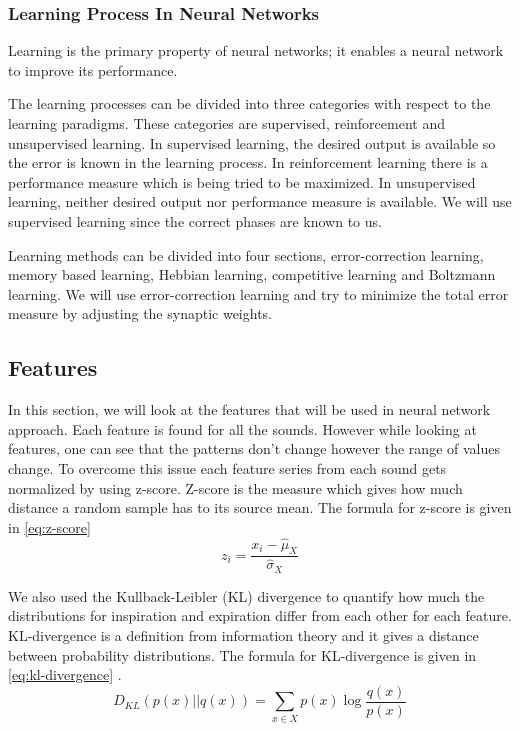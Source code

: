 \subsubsection{Learning Process In Neural Networks}
Learning is the primary property of neural networks; it enables a neural network to improve its performance. \par 
The learning processes can be divided into three categories with respect to the learning paradigms. These categories are supervised, reinforcement and unsupervised learning. In supervised learning, the desired output is available so the error is known in the learning process. In reinforcement learning there is a performance measure which is being tried to be maximized. In unsupervised learning, neither desired output nor performance measure is available. We will use  supervised learning since the correct phases are known to us. \par
Learning methods can be divided into four sections, error-correction learning, memory based learning, Hebbian learning, competitive learning and Boltzmann learning. We will use error-correction learning and try to minimize the total error measure by adjusting the synaptic weights.
\subsection{Features}
In this section, we will look at the features that will be used in neural network approach. Each feature is found for all the sounds. However while looking at features, one can see that the patterns don't change however the range of values change. To overcome this issue each feature series from each sound gets normalized by  using z-score. Z-score is the measure which gives how much distance a random sample has to its source mean. The formula for z-score is given in \eqref{eq:z-score}
\begin{equation}\label{eq:z-score}
z_i = \frac{x_i - \hat{\mu}_X}{\hat{\sigma}_X}
\end{equation} \par
We also used the Kullback-Leibler (KL) divergence to quantify how much the distributions for inspiration and expiration differ from each other for each feature. KL-divergence is a definition from information theory and it gives a distance between probability distributions. The formula for KL-divergence is given in \eqref{eq:kl-divergence} \cite{info-theory}.
\begin{equation}\label{eq:kl-divergence}
D_{KL}(p(x)||q(x)) = \sum_{x \in X}p(x)\log\frac{q(x)}{p(x)}
\end{equation} 
